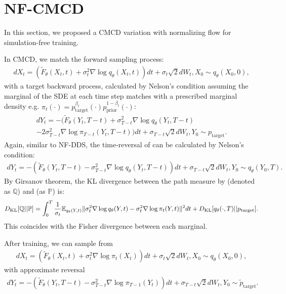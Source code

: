 \documentclass{article} %
\def\ptilde{\tilde{p}_\text{target}}
\begin{document}
\section{NF-CMCD}\label{appendix:nf-cmcd}
In this section, we proposed a CMCD variation with normalizing flow for simulation-free training.
\par
In CMCD, we match the forward sampling process:
\begin{align}\label{eq:nf-sde-cmcd}
        dX_t = \left(\tilde{F}_\theta(X_t, t) + \sigma_t^2 \nabla\log q_\theta(X_t, t) \right)dt + \sigma_t\sqrt{2} dW_t, X_0 \sim q_\theta(X_0, 0),
    \end{align}
 with a target backward process, calculated by Nelson's condition assuming the marginal of the SDE at each time step matches with a prescribed marginal density  e.g. $\pi_t(\cdot) = p_\text{target}^{\beta_t}(\cdot)p_\text{prior}^{1-\beta_t}(\cdot)$:
 \begin{multline}\label{eq:nf-sde-cmcd-target}
        dY_t = -\Big(\tilde{F}_\theta(Y_t, T-t) + \sigma_{T-t}^2 \nabla\log q_\theta(Y_t, T-t)\\- 2 \sigma_{T-t}^2 \nabla\log \pi_{T-t}(Y_t, T-t) \Big)dt + \sigma_{T-t}\sqrt{2} dW_t, Y_0 \sim p_\text{target}.
 \end{multline}
Again, similar to NF-DDS, the time-reversal of  can be calculated by Nelson's condition:
\begin{align}\label{eq:nf-sde-cmcd-backward}
     dY_t = -\left(\tilde{F}_\theta(Y_t, T-t) - \sigma_{T-t}^2 \nabla\log q_\theta(Y_t, T-t) \right)dt + \sigma_{T-t}\sqrt{2} dW_t, Y_0 \sim q_\theta(Y_0, T).
\end{align}
By Girsanov theorem, the KL divergence between the path measure by  (denoted as $\mathbb{Q}$) and  (as $\mathbb{P}$) is:
\begin{align}
  D_\text{KL}[\mathbb{Q}||\mathbb{P}] = 
    \int_0^T \frac{1}{\sigma_{t}} \mathbb{E}_{{q_\theta(Y, t)}} \| \sigma_{t}^2 \nabla\log q_\theta(Y, t) - \sigma_{t}^2 \nabla\log \pi_{t}(Y, t) 
    \|^2 dt+ D_\text{KL}[q_\theta(\cdot, T)|| p_\text{target}].
\end{align}
This coincides with the Fisher divergence between each marginal.

\par
After training, we can sample from 
\begin{align}\label{eq:nf-sde-cmcd_forward}
        dX_t = \left(\tilde{F}_\theta(X_t, t) + \sigma_t^2 \nabla\log \pi_t(X_t) \right)dt + \sigma_t\sqrt{2} dW_t, X_0 \sim q_\theta(X_0, 0),
\end{align}
with approximate reversal
\begin{align}\label{eq:nf-sde-cmcd-backward_sample}
     dY_t = -\left(\tilde{F}_\theta(Y_t, T-t) - \sigma_{T-t}^2 \nabla\log \pi_{T-1}(Y_t) \right)dt + \sigma_{T-t}\sqrt{2} dW_t, Y_0 \sim \ptilde.
\end{align}
\end{document}

